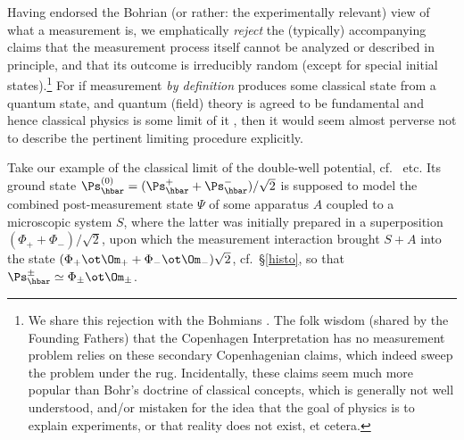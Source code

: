 \documentclass[12pt]{article}
\begin{document}
Having   endorsed the Bohrian (or rather: the experimentally relevant) view of what a measurement is, we emphatically \emph{reject} the (typically) accompanying claims that the measurement process itself cannot be analyzed or described in principle, and that its outcome is irreducibly random (except for special initial states).\footnote{We share this rejection with the Bohmians \cite{Cushing}.
The folk wisdom (shared by the Founding Fathers) that the Copenhagen Interpretation has no measurement problem relies on these secondary Copenhagenian claims, which indeed sweep the problem under the rug. Incidentally, these claims seem much more popular than Bohr's doctrine of classical concepts, which is generally not well understood, and/or mistaken for the idea that the goal of physics is to explain experiments, or that reality does not exist, et cetera. }
For if measurement \emph{by definition} produces some classical state from a quantum state, and
quantum (field) theory is agreed to be fundamental and hence classical physics is some limit of it \cite{book,handbook},  then it would seem almost perverse  not to describe the pertinent limiting procedure explicitly. 

Take our example of the classical limit of the double-well potential, cf.\   etc. Its ground state $\Ps_{\hbar}^{(0)}=(\Ps_{\hbar}^{+}+\Ps_{\hbar}^{-})/\sqrt{2}$ is supposed to model the combined post-measurement state $\Psi$ of  some apparatus $A$ coupled to a  microscopic system $S$, where the latter was initially prepared in a superposition $(\Phi_+ +\Phi_-)/\sqrt{2}$,
upon which the measurement interaction brought $S+A$ into the state $(\Phi_+\ot\Om_++\Phi_-\ot\Om_-)\sqrt{2}$, cf.\ \S\ref{histo}, so that
$\Ps_{\hbar}^{\pm}\simeq\Phi_{\pm}\ot\Om_{\pm}$.
\end{document}
